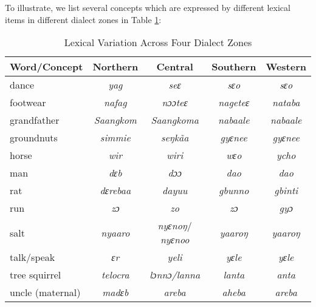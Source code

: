 \begin{refsection}
To illustrate, we list several concepts which are expressed by different lexical items in different dialect zones in Table \ref{tab:dialects}:
\begin{table}[]
    \centering
    \begin{tabular}{lcccc}\\
    Word/Concept & Northern & Central & Southern & Western \\\hline
    dance    &\textit{ yag} &\textit{seɛ}  & \textit{ sɛo}&\textit{sɛo} \\
    footwear    &\textit{ nafag} &\textit{nɔɔteɛ}  & \textit{nageteɛ}&\textit{ nataba} \\
    grandfather    &\textit{ Saangkom} &\textit{ Saangkoma}  & \textit{ nabaale}&\textit{ nabaale} \\
    groundnuts    &\textit{ simmie} &\textit{seŋkãa}& \textit{ gyɛnee}&\textit{ gyɛnee} \\
    horse    &\textit{ wir} &\textit{ wiri}  & \textit{ wɛo}&\textit{ ycho} \\
    man    &\textit{dɛb} &\textit{dɔɔ}  & \textit{dao}&\textit{dao} \\
    rat    &\textit{ dɛrebaa} &\textit{dayuu}  & \textit{ gbunno}&\textit{ gbinti} \\
    run    &\textit{zɔ} &\textit{zo}  & \textit{zɔ}&\textit{gyɔ} \\
    salt  & \textit{ nyaaro} &  \textit{ nyɛnoŋ}/\textit{ nyɛnoo}& \textit{yaaroŋ}     & \textit{yaaroŋ}  \\
    talk/speak    &\textit{ ɛr} &\textit{yeli}  & \textit{yɛle}&\textit{yɛle} \\
    tree squirrel    &\textit{ telocra} &\textit{ lɔnnɔ/lanna}  & \textit{ lanta}&\textit{ anta} \\
    uncle (maternal)    &\textit{ madɛb} &\textit{ areba}  & \textit{ aheba}&\textit{ areba} \\


    \end{tabular}
    \caption{Lexical Variation Across Four Dialect Zones}
    \label{tab:dialects}
\end{table}

    
    
     

   




\end{refsection}
